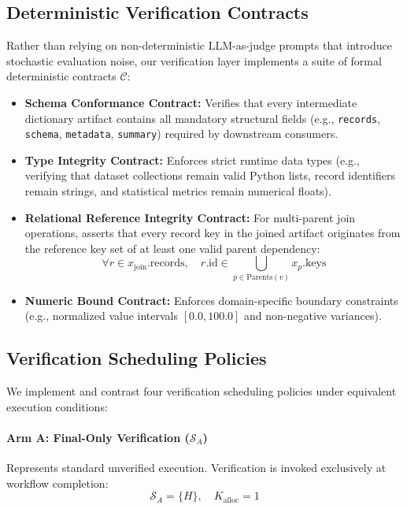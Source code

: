 \subsection{Deterministic Verification Contracts}
Rather than relying on non-deterministic LLM-as-judge prompts that introduce stochastic evaluation noise, our verification layer implements a suite of formal deterministic contracts $\mathcal{C}$:
\begin{itemize}
    \item \textbf{Schema Conformance Contract:} Verifies that every intermediate dictionary artifact contains all mandatory structural fields (e.g., \texttt{records}, \texttt{schema}, \texttt{metadata}, \texttt{summary}) required by downstream consumers.
    \item \textbf{Type Integrity Contract:} Enforces strict runtime data types (e.g., verifying that dataset collections remain valid Python lists, record identifiers remain strings, and statistical metrics remain numerical floats).
    \item \textbf{Relational Reference Integrity Contract:} For multi-parent join operations, asserts that every record key in the joined artifact originates from the reference key set of at least one valid parent dependency:
    \begin{equation}
        \forall r \in x_{\text{join}}.\text{records}, \quad r.\text{id} \in \bigcup_{p \in \text{Parents}(v)} x_p.\text{keys}
    \end{equation}
    \item \textbf{Numeric Bound Contract:} Enforces domain-specific boundary constraints (e.g., normalized value intervals $[0.0, 100.0]$ and non-negative variances).
\end{itemize}

\subsection{Verification Scheduling Policies}
We implement and contrast four verification scheduling policies under equivalent execution conditions:

\paragraph{Arm A: Final-Only Verification ($\mathcal{S}_A$)}
Represents standard unverified execution. Verification is invoked exclusively at workflow completion:
\begin{equation}
    \mathcal{S}_A = \{H\}, \quad K_{\text{alloc}} = 1
\end{equation}

